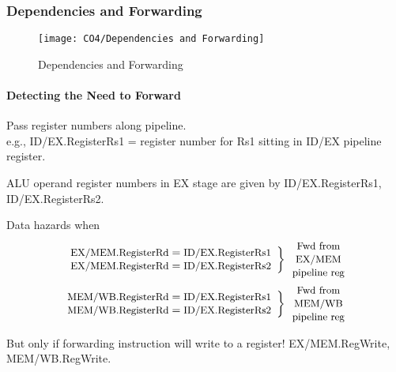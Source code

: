 \subsubsection{Dependencies and Forwarding}
\begin{figure}[!htb]
    \centering
    \texttt{[image: CO4/Dependencies and Forwarding]}
    \caption{Dependencies and Forwarding}
\end{figure}

\paragraph{Detecting the Need to Forward}
Pass register numbers along pipeline.\\ e.g., ID/EX.RegisterRs1 = register number for Rs1 sitting in ID/EX pipeline register. 

ALU operand register numbers in EX stage are given by {ID/EX.RegisterRs1, ID/EX.RegisterRs2}. 

Data hazards when
\begin{align*}
    \left.\begin{array}{c}
        \text{\small EX/MEM.RegisterRd}=\text{\small ID/EX.RegisterRs1}\\
        \text{\small EX/MEM.RegisterRd}=\text{\small ID/EX.RegisterRs2}
    \end{array}\right\} \begin{array}{c}
        \text{\small Fwd from}\\
        \text{\small EX/MEM}\\
        \text{\small pipeline reg}
    \end{array}\\
    \left.\begin{array}{c}
        \text{\small MEM/WB.RegisterRd}=\text{\small ID/EX.RegisterRs1}\\
        \text{\small MEM/WB.RegisterRd}=\text{\small ID/EX.RegisterRs2}
    \end{array}\right\} \begin{array}{c}
        \text{\small Fwd from}\\
        \text{\small MEM/WB}\\
        \text{\small pipeline reg}
    \end{array}
\end{align*}

But only if forwarding instruction will write to a register! EX/MEM.RegWrite, MEM/WB.RegWrite. 

